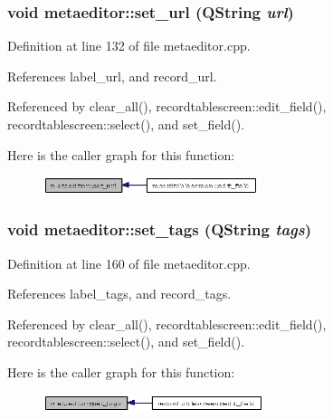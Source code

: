 \subsubsection{\setlength{\rightskip}{0pt plus 5cm}void metaeditor::set\_\-url (QString {\em url})}\label{classmetaeditor_02edd9b23f915125e2b07fb5c6b4dbc7}




Definition at line 132 of file metaeditor.cpp.

References label\_\-url, and record\_\-url.

Referenced by clear\_\-all(), recordtablescreen::edit\_\-field(), recordtablescreen::select(), and set\_\-field().

Here is the caller graph for this function:\begin{figure}[H]
\begin{center}
\leavevmode
\includegraphics[width=178pt]{classmetaeditor_02edd9b23f915125e2b07fb5c6b4dbc7_icgraph}
\end{center}
\end{figure}
\subsubsection{\setlength{\rightskip}{0pt plus 5cm}void metaeditor::set\_\-tags (QString {\em tags})}\label{classmetaeditor_edf5c4b69e3a2fb3b6dbf6d629fd11ff}




Definition at line 160 of file metaeditor.cpp.

References label\_\-tags, and record\_\-tags.

Referenced by clear\_\-all(), recordtablescreen::edit\_\-field(), recordtablescreen::select(), and set\_\-field().

Here is the caller graph for this function:\begin{figure}[H]
\begin{center}
\leavevmode
\includegraphics[width=182pt]{classmetaeditor_edf5c4b69e3a2fb3b6dbf6d629fd11ff_icgraph}
\end{center}
\end{figure}
